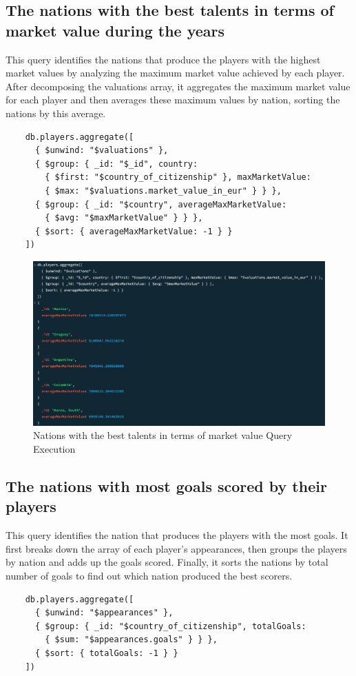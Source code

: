 \documentclass{Configuration_Files/PoliMi3i_thesis}
\begin{document}
\subsection{The nations with the best talents in terms of market value during the years}
This query identifies the nations that produce the players with the highest market values by analyzing the maximum market value achieved by each player. After decomposing the valuations array, it aggregates the maximum market value for each player and then averages these maximum values by nation, sorting the nations by this average.
\begin{verbatim}
    db.players.aggregate([
      { $unwind: "$valuations" },
      { $group: { _id: "$_id", country: 
        { $first: "$country_of_citizenship" }, maxMarketValue:
        { $max: "$valuations.market_value_in_eur" } } },
      { $group: { _id: "$country", averageMaxMarketValue: 
        { $avg: "$maxMarketValue" } } },
      { $sort: { averageMaxMarketValue: -1 } }
    ])
\end{verbatim}
\begin{figure}[htbp]
    \centering
    \includegraphics[scale=0.72]{Images/Queries/Nation_talents_market_value/ntmv.png}
    \caption{Nations with the best talents in terms of market value Query Execution}
\end{figure}

\subsection{The nations with most goals scored by their players}
This query identifies the nation that produces the players with the most goals. It first breaks down the array of each player's appearances, then groups the players by nation and adds up the goals scored. Finally, it sorts the nations by total number of goals to find out which nation produced the best scorers.
\begin{verbatim}
    db.players.aggregate([
      { $unwind: "$appearances" },
      { $group: { _id: "$country_of_citizenship", totalGoals: 
        { $sum: "$appearances.goals" } } },
      { $sort: { totalGoals: -1 } }
    ])
\end{verbatim}
\end{document}
